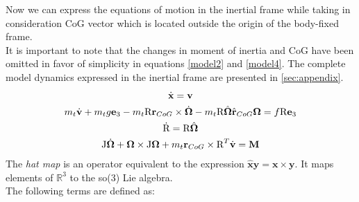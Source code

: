 Now we can express the equations of motion in the inertial frame while taking in consideration CoG vector which is located outside the origin of the body-fixed frame\cite{LeeModel}. \\
It is important to note that the changes in moment of inertia and CoG have been omitted in favor of simplicity in equations \eqref{model2} and \eqref{model4}. The complete model dynamics{\tiny } expressed in the inertial frame are presented in \ref{sec:appendix}.
\begin{gather}
	\dot{\textbf{x}} = \textbf{v} \label{model1}\\
	m_t\dot{\textbf{v}} + m_tg\textbf{e}_3 - m_t\text{R}  \textbf{r}_{CoG} \times \dot{\boldsymbol{\Omega}} - m_t\text{R}\hat{\boldsymbol{\Omega}}\hat{ \textbf{r}}_{CoG}\boldsymbol{\Omega} = f\text{R}\textbf{e}_3 \label{model2} \\
	\dot{\text{R}} = \text{R}\hat{\boldsymbol{\Omega}} \label{model3} \\
	\text{J} \dot{\boldsymbol{\Omega}} + \boldsymbol{\Omega} \times \text{J} \boldsymbol{\Omega} + m_t  \textbf{r}_{CoG} \times \text{R}^T \dot{\textbf{v}} = \textbf{M} \label{model4}
\end{gather}
The \textit{hat map} is an operator equivalent to the expression $\hat{\textbf{x}}\textbf{y} = \textbf{x} \times \textbf{y}$. It maps elements of $\mathbb{R}^3$ to the so(3) Lie algebra. \\
\noindent The following terms are defined as:

